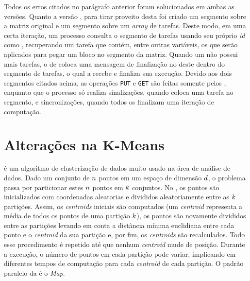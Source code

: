 Todos os erros citados no parágrafo anterior foram solucionados em ambas as versões. Quanto a versão \ASYNC, para tirar proveito desta \API foi criado um segmento sobre a matriz original e um segmento sobre um \textit{array} de tarefas. Deste modo, em uma certa iteração, um processo \slave consulta o segmento de tarefas usando seu próprio \textit{id} como \offset, recuperando um tarefa que contém, entre outras variáveis, os \offsets que serão aplicados para pegar um bloco no segmento da matriz. Quando um \CC não possui mais tarefas, o \cluster de \IO coloca uma mensagem de finalização no \offset deste \slave dentro do segmento de tarefas, o qual a recebe e finaliza sua execução. Devido aos dois segmentos citados acima, as operações \texttt{PUT} e \texttt{GET} são feitas somente pelos \CCs, enquanto que o processo \master só realiza sinalizações, quando coloca uma tarefa no segmento, e sincronizações, quando todos os \slaves finalizam uma iteração de computação.

\section{Alterações na K-Means}
\label{sec:alteracoeskm}

\textit{\KM} é um algoritmo de clusterização de dados muito usado na área de análise de dados. Dado um conjunto de $\mathnormal{n}$ pontos em um espaço de dimensão $\mathnormal{d}$, o problema passa por particionar estes $\mathnormal{n}$ pontos em $\mathnormal{k}$ conjuntos. No \capb, os pontos são inicializados com coordenadas aleatorias e divididos aleatoriamente entre as $\mathnormal{k}$ partições. Assim, os \textit{centroids} iniciais são computados (um \textit{centroid} representa a média de todos os pontos de uma partição $\mathnormal{k}$), os pontos são novamente divididos entre as partições levando em conta a distância mínima euclidiana entre cada ponto e o \textit{centroid} da sua partição e, por fim, os \textit{centroids} são recalculados. Todo esse procedimento é repetido até que nenhum \textit{centroid} mude de posição. Durante a execução, o número de pontos em cada partição pode variar, implicando em diferentes tempos de computação para cada \textit{centroid} de cada partição. O padrão paralelo da \KM é o \textit{Map}.

